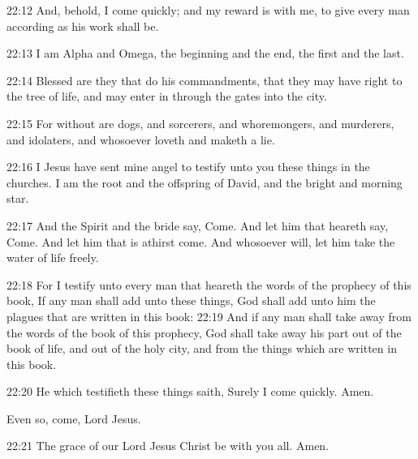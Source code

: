 22:12 And, behold, I come quickly; and my reward is with me, to give
every man according as his work shall be.

22:13 I am Alpha and Omega, the beginning and the end, the first and
the last.

22:14 Blessed are they that do his commandments, that they may have
right to the tree of life, and may enter in through the gates into the
city.

22:15 For without are dogs, and sorcerers, and whoremongers, and
murderers, and idolaters, and whosoever loveth and maketh a lie.

22:16 I Jesus have sent mine angel to testify unto you these things in
the churches. I am the root and the offspring of David, and the bright
and morning star.

22:17 And the Spirit and the bride say, Come. And let him that heareth
say, Come. And let him that is athirst come. And whosoever will, let
him take the water of life freely.

22:18 For I testify unto every man that heareth the words of the
prophecy of this book, If any man shall add unto these things, God
shall add unto him the plagues that are written in this book: 22:19
And if any man shall take away from the words of the book of this
prophecy, God shall take away his part out of the book of life, and
out of the holy city, and from the things which are written in this book.

22:20 He which testifieth these things saith, Surely I come quickly.
Amen.

Even so, come, Lord Jesus.

22:21 The grace of our Lord Jesus Christ be with you all. Amen.

